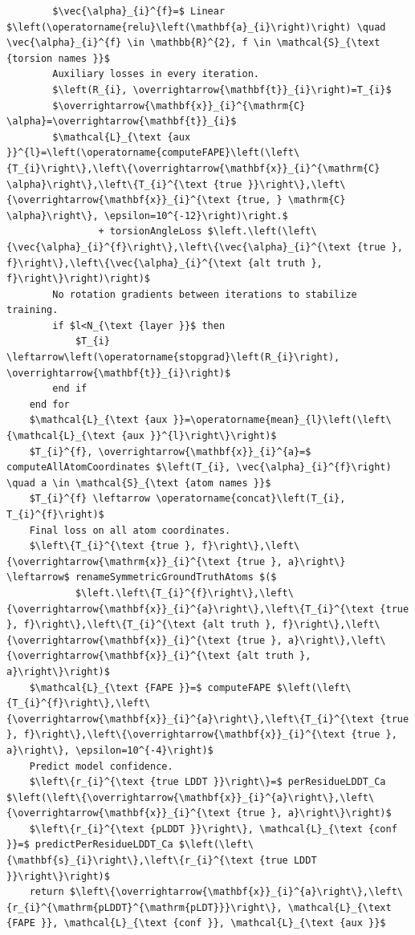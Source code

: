 \documentclass[10pt]{article}
\begin{document}
\begin{verbatim}
        $\vec{\alpha}_{i}^{f}=$ Linear $\left(\operatorname{relu}\left(\mathbf{a}_{i}\right)\right) \quad \vec{\alpha}_{i}^{f} \in \mathbb{R}^{2}, f \in \mathcal{S}_{\text {torsion names }}$
        Auxiliary losses in every iteration.
        $\left(R_{i}, \overrightarrow{\mathbf{t}}_{i}\right)=T_{i}$
        $\overrightarrow{\mathbf{x}}_{i}^{\mathrm{C} \alpha}=\overrightarrow{\mathbf{t}}_{i}$
        $\mathcal{L}_{\text {aux }}^{l}=\left(\operatorname{computeFAPE}\left(\left\{T_{i}\right\},\left\{\overrightarrow{\mathbf{x}}_{i}^{\mathrm{C} \alpha}\right\},\left\{T_{i}^{\text {true }}\right\},\left\{\overrightarrow{\mathbf{x}}_{i}^{\text {true, } \mathrm{C} \alpha}\right\}, \epsilon=10^{-12}\right)\right.$
                + torsionAngleLoss $\left.\left(\left\{\vec{\alpha}_{i}^{f}\right\},\left\{\vec{\alpha}_{i}^{\text {true }, f}\right\},\left\{\vec{\alpha}_{i}^{\text {alt truth }, f}\right\}\right)\right)$
        No rotation gradients between iterations to stabilize training.
        if $l<N_{\text {layer }}$ then
            $T_{i} \leftarrow\left(\operatorname{stopgrad}\left(R_{i}\right), \overrightarrow{\mathbf{t}}_{i}\right)$
        end if
    end for
    $\mathcal{L}_{\text {aux }}=\operatorname{mean}_{l}\left(\left\{\mathcal{L}_{\text {aux }}^{l}\right\}\right)$
    $T_{i}^{f}, \overrightarrow{\mathbf{x}}_{i}^{a}=$ computeAllAtomCoordinates $\left(T_{i}, \vec{\alpha}_{i}^{f}\right) \quad a \in \mathcal{S}_{\text {atom names }}$
    $T_{i}^{f} \leftarrow \operatorname{concat}\left(T_{i}, T_{i}^{f}\right)$
    Final loss on all atom coordinates.
    $\left\{T_{i}^{\text {true }, f}\right\},\left\{\overrightarrow{\mathrm{x}}_{i}^{\text {true }, a}\right\} \leftarrow$ renameSymmetricGroundTruthAtoms $($
            $\left.\left\{T_{i}^{f}\right\},\left\{\overrightarrow{\mathbf{x}}_{i}^{a}\right\},\left\{T_{i}^{\text {true }, f}\right\},\left\{T_{i}^{\text {alt truth }, f}\right\},\left\{\overrightarrow{\mathbf{x}}_{i}^{\text {true }, a}\right\},\left\{\overrightarrow{\mathbf{x}}_{i}^{\text {alt truth }, a}\right\}\right)$
    $\mathcal{L}_{\text {FAPE }}=$ computeFAPE $\left(\left\{T_{i}^{f}\right\},\left\{\overrightarrow{\mathbf{x}}_{i}^{a}\right\},\left\{T_{i}^{\text {true }, f}\right\},\left\{\overrightarrow{\mathbf{x}}_{i}^{\text {true }, a}\right\}, \epsilon=10^{-4}\right)$
    Predict model confidence.
    $\left\{r_{i}^{\text {true LDDT }}\right\}=$ perResidueLDDT_Ca $\left(\left\{\overrightarrow{\mathbf{x}}_{i}^{a}\right\},\left\{\overrightarrow{\mathbf{x}}_{i}^{\text {true }, a}\right\}\right)$
    $\left\{r_{i}^{\text {pLDDT }}\right\}, \mathcal{L}_{\text {conf }}=$ predictPerResidueLDDT_Ca $\left(\left\{\mathbf{s}_{i}\right\},\left\{r_{i}^{\text {true LDDT }}\right\}\right)$
    return $\left\{\overrightarrow{\mathbf{x}}_{i}^{a}\right\},\left\{r_{i}^{\mathrm{pLDDT}^{\mathrm{pLDT}}}\right\}, \mathcal{L}_{\text {FAPE }}, \mathcal{L}_{\text {conf }}, \mathcal{L}_{\text {aux }}$
\end{verbatim}
\end{document}
